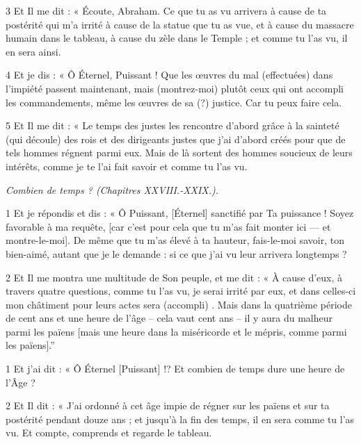\par 3 Et Il me dit : « Écoute, Abraham. Ce que tu as vu arrivera à cause de ta postérité qui m'a irrité à cause de la statue que tu as vue, et à cause du massacre humain dans le tableau, à cause du zèle dans le Temple ; et comme tu l’as vu, il en sera ainsi.

\par 4 Et je dis : « Ô Éternel, Puissant ! Que les œuvres du mal (effectuées) dans l'impiété passent maintenant, mais (montrez-moi) plutôt ceux qui ont accompli les commandements, même les œuvres de sa (?) justice. Car tu peux faire cela.

\par 5 Et Il me dit : « Le temps des justes les rencontre d'abord grâce à la sainteté (qui découle) des rois et des dirigeants justes que j'ai d'abord créés pour que de tels hommes régnent parmi eux. Mais de là sortent des hommes soucieux de leurs intérêts, comme je te l'ai fait savoir et comme tu l'as vu.


\par \textit{Combien de temps ? (Chapitres XXVIII.-XXIX.).}

\par 1 Et je répondis et dis : « Ô Puissant, [Éternel] sanctifié par Ta puissance ! Soyez favorable à ma requête, [car c'est pour cela que tu m'as fait monter ici — et montre-le-moi]. De même que tu m'as élevé à ta hauteur, fais-le-moi savoir, ton bien-aimé, autant que je le demande : si ce que j'ai vu leur arrivera longtemps ?

\par 2 Et Il me montra une multitude de Son peuple, et me dit : « À cause d'eux, à travers quatre questions, comme tu l'as vu, je serai irrité par eux, et dans celles-ci mon châtiment pour leurs actes sera (accompli) . Mais dans la quatrième période de cent ans et une heure de l’âge – cela vaut cent ans – il y aura du malheur parmi les païens [mais une heure dans la miséricorde et le mépris, comme parmi les païens].”


\par 1 Et j'ai dit : « Ô Éternel [Puissant] !? Et combien de temps dure une heure de l’Âge ?

\par 2 Et Il dit : « J'ai ordonné à cet âge impie de régner sur les païens et sur ta postérité pendant douze ans ; et jusqu'à la fin des temps, il en sera comme tu l'as vu. Et compte, comprends et regarde le tableau.

